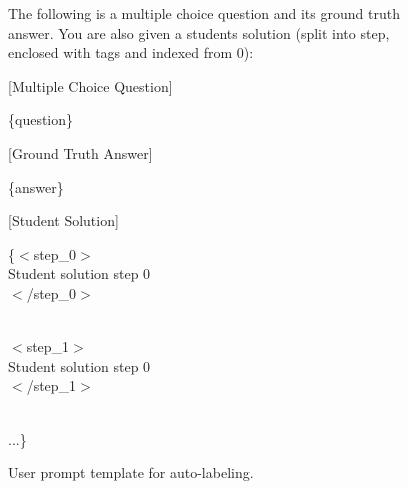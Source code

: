\begin{figure}[ht]
    \centering
    \begin{minipage}{6in}
    \begin{tcolorbox}[width=6in, sharp corners=all, colback=white!95!black]
The following is a multiple choice question and its ground truth answer. You are also given a students solution (split into step, enclosed with tags and indexed from 0):

\-

[Multiple Choice Question]

\{question\}

\-

[Ground Truth Answer]

\{answer\}

\-

[Student Solution]

\{$<$step\_0$>$\\
Student solution step 0\\
$<$/step\_0$>$

\-\\
$<$step\_1$>$\\
Student solution step 0\\
$<$/step\_1$>$

\-\\...\}

\end{tcolorbox}
    \end{minipage}
    \caption{User prompt template for auto-labeling.}
    \label{fig:v6-auto-label-prompt}
\end{figure}

